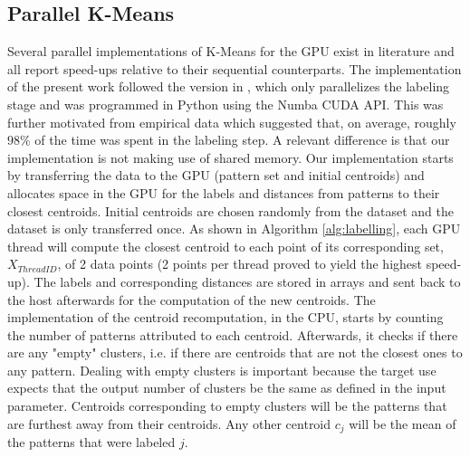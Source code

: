 
\subsection{Parallel K-Means}



Several parallel implementations of K-Means for the GPU exist in literature \cite{Zechner2009,Sirotkovi2012} and all report speed-ups relative to their sequential counterparts.
The implementation of the present work followed the version in \cite{Zechner2009}, which only parallelizes the labeling stage and was programmed in Python using the Numba CUDA API. %
This was further motivated from empirical data which suggested that, on average, roughly $98 \%$ of the time was spent in the labeling step.
A relevant difference is that our implementation is not making use of shared memory.
Our implementation starts by transferring the data to the GPU (pattern set and initial centroids) and allocates space in the GPU for the labels and distances from patterns to their closest centroids.
Initial centroids are chosen randomly from the dataset and the dataset is only transferred once.
As shown in Algorithm \ref{alg:labelling}, each GPU thread will compute the closest centroid to each point of its corresponding set, $X_{ThreadID}$, of 2 data points (2 points per thread proved to yield the highest speed-up).
The labels and corresponding distances are stored in arrays and sent back to the host afterwards for the computation of the new centroids.
The implementation of the centroid recomputation, in the CPU, starts by counting the number of patterns attributed to each centroid.
Afterwards, it checks if there are any "empty" clusters, i.e. if there are centroids that are not the closest ones to any pattern.
Dealing with empty clusters is important because the target use expects that the output number of clusters be the same as defined in the input parameter.
Centroids corresponding to empty clusters will be the patterns that are furthest away from their centroids.
Any other centroid $c_j$ will be the mean of the patterns that were labeled $j$.

